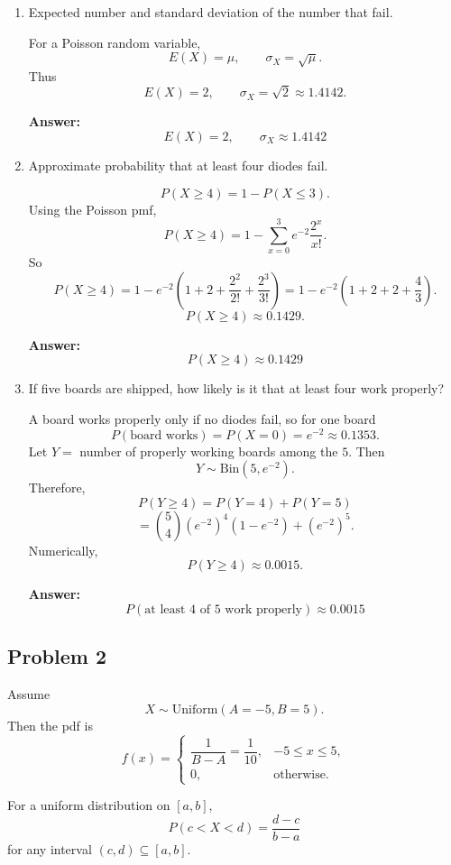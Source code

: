 \documentclass[11pt]{article}
\begin{document}
\begin{enumerate}
    \item[(a)] Expected number and standard deviation of the number that fail.

    For a Poisson random variable,
    \[
    E(X)=\mu,\qquad \sigma_X=\sqrt{\mu}.
    \]
    Thus
    \[
    E(X)=2,\qquad \sigma_X=\sqrt{2}\approx 1.4142.
    \]

    \textbf{Answer:}
    \[
    \boxed{E(X)=2,\qquad \sigma_X\approx 1.4142}
    \]

    \item[(b)] Approximate probability that at least four diodes fail.

    \[
    P(X\ge 4)=1-P(X\le 3).
    \]
    Using the Poisson pmf,
    \[
    P(X\ge 4)=1-\sum_{x=0}^{3} e^{-2}\frac{2^x}{x!}.
    \]
    So
    \[
    P(X\ge 4)
    =1-e^{-2}\left(1+2+\frac{2^2}{2!}+\frac{2^3}{3!}\right)
    =1-e^{-2}\left(1+2+2+\frac{4}{3}\right).
    \]
    \[
    P(X\ge 4)\approx 0.1429.
    \]

    \textbf{Answer:}
    \[
    \boxed{P(X\ge 4)\approx 0.1429}
    \]

    \item[(c)] If five boards are shipped, how likely is it that at least four work properly?

    A board works properly only if no diodes fail, so for one board
    \[
    P(\text{board works})=P(X=0)=e^{-2}\approx 0.1353.
    \]
    Let \(Y=\) number of properly working boards among the \(5\). Then
    \[
    Y\sim \mathrm{Bin}(5,e^{-2}).
    \]
    Therefore,
    \[
    P(Y\ge 4)=P(Y=4)+P(Y=5)
    \]
    \[
    =\binom{5}{4}(e^{-2})^4(1-e^{-2})+(e^{-2})^5.
    \]
    Numerically,
    \[
    P(Y\ge 4)\approx 0.0015.
    \]

    \textbf{Answer:}
    \[
    \boxed{P(\text{at least 4 of 5 work properly})\approx 0.0015}
    \]
\end{enumerate}

\subsection*{Problem 2}

Assume
\[
X\sim \text{Uniform}(A=-5,B=5).
\]
Then the pdf is
\[
f(x)=
\begin{cases}
\dfrac{1}{B-A}=\dfrac{1}{10}, & -5\le x\le 5,\\[6pt]
0, & \text{otherwise.}
\end{cases}
\]

For a uniform distribution on \([a,b]\),
\[
P(c<X<d)=\frac{d-c}{b-a}
\]
for any interval \((c,d)\subseteq [a,b]\).
\end{document}
